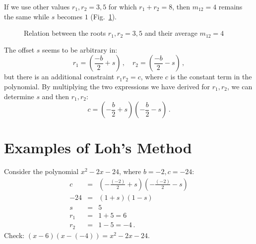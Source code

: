 If we use other values $r_1,r_2=3,5$ for which $r_1+r_2=8$, then $m_{12}=4$ remains the same while $s$ becomes $1$ (Fig.~\ref{f.loh-roots2}).
\begin{figure}[b]
\begin{center}
\end{center}
\caption{Relation between the roots $r_1,r_2=3,5$ and their average $m_{12}=4$}
\label{f.loh-roots2}
\end{figure}
The offset $s$ seems to be arbitrary in:
\[
r_1=\left(\frac{-b}{2}+s\right)\,,\quad r_2=\left(\frac{-b}{2}-s\right)\,,
\]
\enlargethispage{\baselineskip}
\hspace*{-4pt}but there is an additional constraint $r_1r_2=c$, where $c$ is the constant term in the polynomial.
By multiplying the two expressions we have derived for $r_1,r_2$, we can determine $s$ and then $r_1,r_2$:
\[
c=\left(-\frac{b}{2} +s\right)\left(-\frac{b}{2} -s\right)\,.
\]

\section{Examples of Loh's Method}\label{s.examples}

\begin{example}
Consider the polynomial  $x^2-2x-24$, where $b=-2,c=-24$:
\begin{eqnarray*}
c&=&\left(-\frac{(-2)}{2} +s\right)\left(-\frac{(-2)}{2} -s\right)\\
-24&=&(1 +s)(1 -s)\\
s&=&5\\
r_1&=&1+5=6\\
r_2&=&1-5=-4\,.
\end{eqnarray*}
Check: $(x-6)(x-(-4))= x^2-2x-24$.
\end{example}

